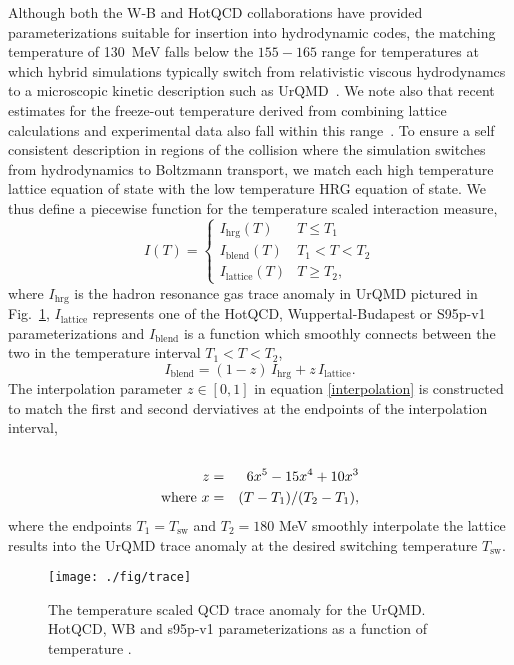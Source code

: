 \documentclass[aps,prc,reprint,amsmath,nofootinbib,superscriptaddress]{revtex4-1}
\begin{document}
Although both the W-B and HotQCD collaborations have provided parameterizations suitable for insertion into hydrodynamic codes, the matching temperature
of 130~MeV falls below the $155-165$ range for temperatures at which hybrid simulations typically switch from relativistic viscous hydrodynamcs to 
a microscopic kinetic description such as UrQMD~\cite{standard_UrQMD_ref_1998}.  We note also that recent estimates for the freeze-out temperature derived from combining
lattice calculations and experimental data also fall within this range~\cite{PhysRevLett.113.072001,arXiv:1506.07834}.  
To ensure a self consistent description in regions of the collision where the simulation switches from hydrodynamics to Boltzmann transport, we match each high 
temperature lattice equation of state with the low temperature HRG equation of state. We thus define a piecewise function for the temperature scaled interaction measure,
\begin{equation}
 \label{interaction}
 I(T) =
  \begin{cases}
   I_\text{hrg}(T)	& T \le T_1 \\
   I_\text{blend}(T)	& T_1 < T < T_2 \\ 
   I_\text{lattice}(T)	& T \ge T_2,
  \end{cases}
\end{equation}
where $I_\text{hrg}$ is the hadron resonance gas trace anomaly in UrQMD pictured in Fig.~\ref{fig:trace}, $I_\text{lattice}$ represents one of the HotQCD, Wuppertal-Budapest or S95p-v1 
parameterizations and $I_\text{blend}$ is a function which smoothly connects between the two in the temperature interval $T_1 < T < T_2$,
\begin{equation}
  \label{interpolation}
  I_\text{blend} = (1-z)\, I_\text{hrg} + z\, I_\text{lattice}.
\end{equation}
The interpolation parameter $z \in [0,1]$ in equation \ref{interpolation} is constructed to match the first and second derviatives at the endpoints of the 
interpolation interval,
\begin{eqnarray}
 \label{smoothstep}
 \cr z &=& 6 x^5 - 15 x^4 + 10 x^3 \\
  \text{where } x &=& (T - T_1)/(T_2 - T_1),
\end{eqnarray}
where the endpoints $T_1 = T_\text{sw}$ and $T_2 = 180$ MeV smoothly interpolate the lattice results into the UrQMD trace anomaly at the desired switching 
temperature $T_\text{sw}$.

\begin{figure}[t]
  \texttt{[image: ./fig/trace]}
  \caption{\label{fig:trace} The temperature scaled QCD trace anomaly for the UrQMD. HotQCD, WB and s95p-v1 parameterizations as a function of temperature \cite{?}.}
\end{figure}
\end{document}

